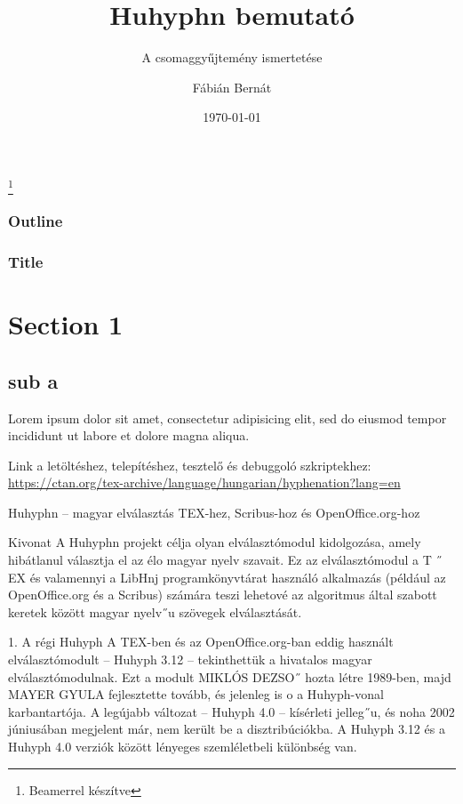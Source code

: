 \documentclass[11pt]{beamer}
\title{Huhyphn bemutató}
\subtitle{A \texttt{\packageName} csomaggyűjtemény ismertetése}
\author{Fábián Bernát}
\institute{Szegedi Tudományegyetem}
\date{\today}
\begin{document}
    \begin{frame}
        \titlepage
        \footnote{Beamerrel készítve}
    \end{frame}

    \begin{frame}
        \frametitle{Outline}
        \tableofcontents
    \end{frame}

    \begin{frame}
        \frametitle{Title}
        \section{Section 1}\label{sec:section-1}

        \subsection{sub a}\label{subsec:sub-a}

        Lorem ipsum dolor sit amet, consectetur adipisicing elit, sed do eiusmod tempor incididunt ut labore et dolore magna aliqua.
    \end{frame}

    \begin{frame}
        Link a letöltéshez, telepítéshez, tesztelő és debuggoló szkriptekhez:
        \href{https://ctan.org/tex-archive/language/hungarian/hyphenation?lang=en}{https://ctan.org/tex-archive/language/hungarian/hyphenation?lang=en}
    \end{frame}

    \begin{frame}
    {Huhyphn – magyar elválasztás TEX-hez,
        Scribus-hoz és OpenOffice.org-hoz}

    \end{frame}

    \begin{frame}
    {Kivonat}
        A Huhyphn projekt célja olyan elválasztómodul kidolgozása, amely hibátlanul választja el az élo magyar nyelv szavait.
        Ez az elválasztómodul a T ˝ EX és valamennyi a
        LibHnj programkönyvtárat használó alkalmazás (például az OpenOffice.org és a Scribus) számára teszi lehetové az algoritmus által szabott keretek között magyar nyelv˝u
        szövegek elválasztását.
    \end{frame}

    \begin{frame}
        1. A régi Huhyph
        A TEX-ben és az OpenOffice.org-ban eddig használt elválasztómodult – Huhyph 3.12 –
        tekinthettük a hivatalos magyar elválasztómodulnak.
        Ezt a modult MIKLÓS DEZSO˝ hozta
        létre 1989-ben, majd MAYER GYULA fejlesztette tovább, és jelenleg is o a Huhyph-vonal
        karbantartója.
        A legújabb változat – Huhyph 4.0 – kísérleti jelleg˝u, és noha 2002 júniusában
        megjelent már, nem került be a disztribúciókba.
        A Huhyph 3.12 és a Huhyph 4.0 verziók
        között lényeges szemléletbeli különbség van.
    \end{frame}
\end{document}
